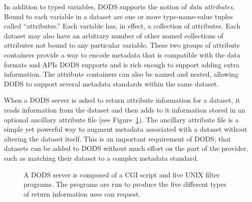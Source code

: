 \documentclass[12pt]{article}
\begin{document}
In addition to typed variables, \ac{DODS} supports the notion of \emph{data
  attributes}.  Bound to each variable in a dataset are one or more
type-name-value tuples called ``attributes.''  Each variable has, in effect,
a collection of attributes.  Each dataset may also have an arbitrary number
of other named collections of attributes not bound to any particular
variable. These two groups of attribute containers provide a way to encode
metadata that is compatible with the data formats and \ac{API}s \ac{DODS}
supports and is rich enough to support adding extra information.  The
attribute containers can also be named and nested, allowing \ac{DODS} to
support several metadata standards within the same dataset.

When a \ac{DODS} server is asked to return attribute information for a
dataset, it reads information from the dataset and then adds to it
information stored in an optional ancillary attribute file (see
Figure~\ref{fig:server-arch}). The ancillary attribute file is a simple yet
powerful way to augment metadata associated with a dataset without
altering the dataset itself. This is an important
requirement of \ac{DODS}; that datasets can be added to \ac{DODS} without
much effort on the part of the provider, such as matching their dataset to
a complex metadata standard. 

\begin{figure}[htbp]
\begin{center}
\caption{A DODS server is composed of a CGI script and five UNIX
  filter  programs. The programs are run to produce the five different types of
  return information uses can request.}
\label{fig:server-arch}
\end{center}
\end{figure}
\end{document}
